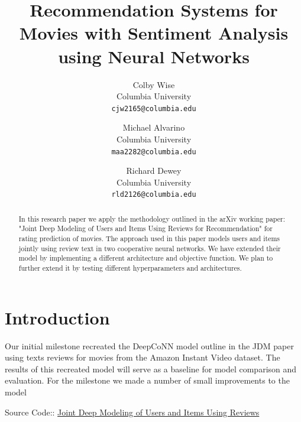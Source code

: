 \documentclass[10pt,twocolumn,letterpaper]{article}
\begin{document}
\title{Recommendation Systems for Movies with Sentiment Analysis using Neural Networks}

\author{Colby Wise\\
Columbia University\\
{\tt\small cjw2165@columbia.edu}
\and
Michael Alvarino\\
Columbia University\\
{\tt\small maa2282@columbia.edu}
\and
Richard Dewey\\
Columbia University\\
{\tt\small rld2126@columbia.edu}
}

\maketitle

\begin{abstract}
   In this research paper we apply the methodology outlined in the
   arXiv working paper: "Joint Deep Modeling of Users and Items Using Reviews for Recommendation" 
   for rating prediction of movies. The approach used in this paper
   models users and items jointly using review text in two cooperative neural networks.  
   We have extended their model by implementing a different architecture and 
   objective function. We plan to further extend it by testing different hyperparameters
   and architectures.
\end{abstract}

\section{Introduction}

Our initial milestone recreated the 
DeepCoNN model outline in the JDM paper using texts reviews for movies from 
the Amazon Instant Video dataset. The results of this recreated model 
will serve as a baseline for model comparison and evaluation.
For the milestone we made a number of small improvements to the model
   
   Source Code:: \href{https://github.com/michaelAlvarino/Deep-Learning}
   {Joint Deep Modeling of Users and Items Using Reviews}
\end{document}
